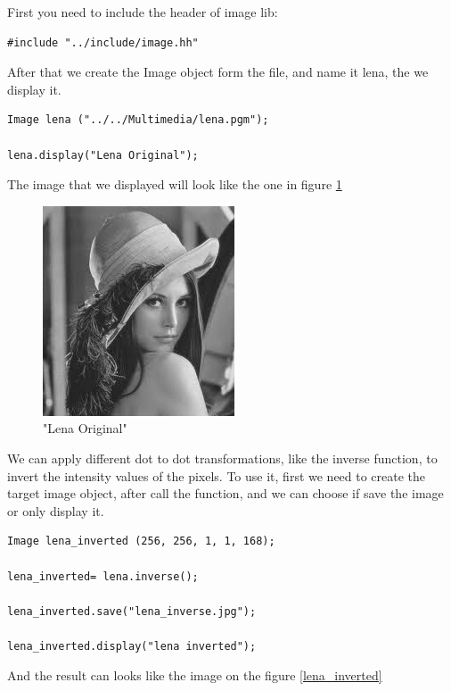 \documentclass[a4paper]{article}
\begin{document}
First you need to include the header of image lib:

\begin{lstlisting}
#include "../include/image.hh"
\end{lstlisting}

After that we create the Image object form the file, and name it lena, the we display it.

\begin{lstlisting}
Image lena ("../../Multimedia/lena.pgm");
		
lena.display("Lena Original");
\end{lstlisting}

The image that we displayed will look like the one in figure \ref{lena_original}
\begin{figure}[H]

\centering
\includegraphics[scale=0.5]{./.Multimedia/lena.jpg}

\caption{"Lena Original"}
\label{lena_original}

\end{figure}

We can apply different dot to dot transformations, like the inverse function, to invert the intensity values of the pixels. To use it, first we need to create the target image object, after call the function, and we can choose if save the image or only display it. 
\begin{lstlisting}
Image lena_inverted (256, 256, 1, 1, 168);
	
lena_inverted= lena.inverse();
	
lena_inverted.save("lena_inverse.jpg");
	  
lena_inverted.display("lena inverted");
\end{lstlisting}

And the result can looks like the image on the figure \ref{lena_inverted}
\end{document}
